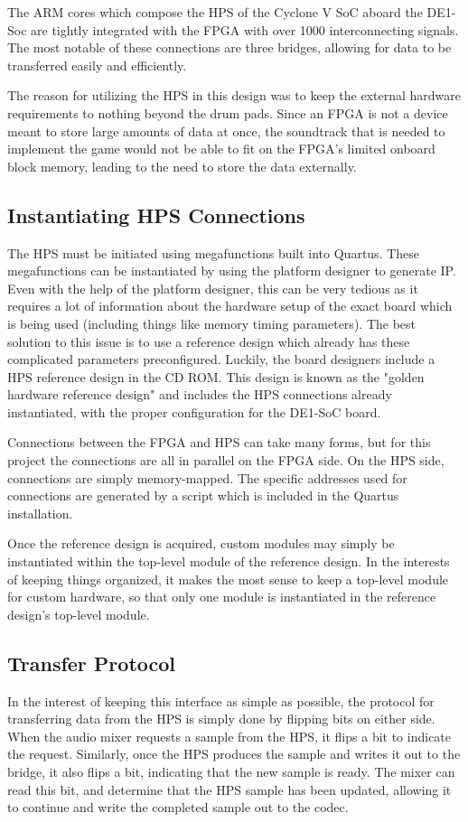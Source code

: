 \documentclass{subfile}
\begin{document}
  The ARM cores which compose the HPS of the Cyclone V SoC aboard the 
  DE1-Soc
  are tightly integrated with the FPGA with over 1000 interconnecting signals.\cite{cv_hps} 
  The most notable of these connections are three bridges, allowing for data to be transferred 
  easily and efficiently.

  The reason for utilizing the HPS in this design was to keep the external hardware requirements 
  to nothing beyond the drum pads. 
  Since an FPGA is not a device meant to store large amounts of data at once, the soundtrack that 
  is needed to implement the game would not be able to fit on the 
  FPGA's limited onboard block memory, leading to the need to store the data externally.

  \subsection{Instantiating HPS Connections}
  The HPS must be initiated using megafunctions built into Quartus. 
  These megafunctions can be instantiated by using the platform designer to generate IP.
  Even with the help of the platform designer, this can be very tedious as it requires a lot of 
  information about the hardware setup of the exact board which is being used (including things like memory timing parameters).
  The best solution to this issue is to use a reference design which already has 
  these complicated parameters 
  preconfigured. 
  Luckily, the board designers include a HPS reference design in the CD ROM. 
  This design is known as the "golden hardware reference design" and includes the HPS connections 
  already instantiated, with the proper configuration for the DE1-SoC board.

  Connections between the FPGA and HPS can take many forms, but for this project the connections 
  are all in parallel on the FPGA side. 
  On the HPS side, connections are simply memory-mapped. 
  The specific addresses used for connections are generated by a script which is included in 
  the Quartus installation.

  Once the reference design is acquired, custom modules may simply be instantiated within the 
  top-level module of the reference design. 
  In the interests of keeping things organized, it makes the most sense to keep a top-level 
  module for custom hardware, so that only one module is instantiated in the reference 
  design's top-level module.

  \subsection{Transfer Protocol} 
  In the interest of keeping this interface as simple as possible, the protocol for transferring 
  data from the HPS is simply done by flipping bits on either side.
  When the audio mixer requests a sample from the HPS, it flips a bit to indicate the request.
  Similarly, once the HPS produces the sample and writes it out to the bridge,
  it also flips a bit, indicating that the new sample is ready. 
  The mixer can read this bit, and determine that the HPS sample has been updated, 
  allowing it to continue and write the completed sample out to the codec.
\end{document}
